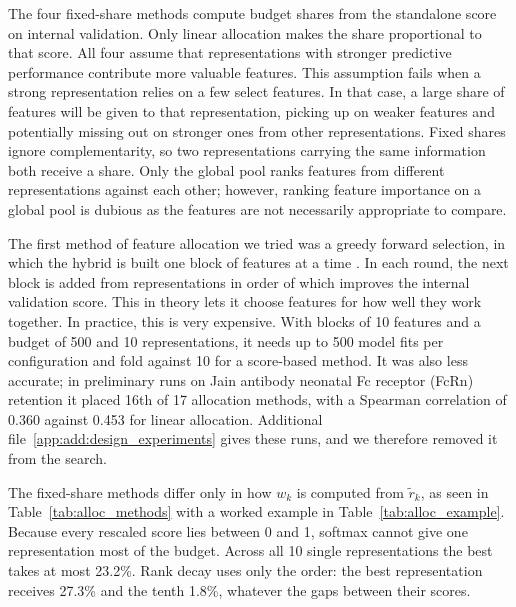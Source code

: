 The four fixed-share methods compute budget shares from the standalone score on internal validation. Only linear allocation makes the share proportional to that score. All four assume that representations with stronger predictive performance contribute more valuable features. This assumption fails when a strong representation relies on a few select features. In that case, a large share of features will be given to that representation, picking up on weaker features and potentially missing out on stronger ones from other representations. Fixed shares ignore complementarity, so two representations carrying the same information both receive a share. Only the global pool ranks features from different representations against each other; however, ranking feature importance on a global pool is dubious as the features are not necessarily appropriate to compare. 

The first method of feature allocation we tried was a greedy forward selection, in which the hybrid is built one block of features at a time  \citep{Kohavi1997, Guyon2003}. In each round, the next block is added from representations in order of which improves the internal validation score. This in theory lets it choose features for how well they work together. In practice, this is very expensive. With blocks of 10 features and a budget of 500 and 10 representations, it needs up to 500 model fits per configuration and fold against 10 for a score-based method. It was also less accurate; in preliminary runs on Jain antibody neonatal Fc receptor (FcRn) retention it placed 16th of 17 allocation methods, with a Spearman correlation of 0.360 against 0.453 for linear allocation. Additional file~\ref{app:add:design_experiments} gives these runs, and we therefore removed it from the search.

The fixed-share methods differ only in how $w_k$ is computed from $\tilde r_k$, as seen in Table~\ref{tab:alloc_methods} with a worked example in Table~\ref{tab:alloc_example}. Because every rescaled score lies between 0 and 1, softmax cannot give one representation most of the budget. Across all 10 single representations the best takes at most 23.2\%. Rank decay uses only the order: the best representation receives 27.3\% and the tenth 1.8\%, whatever the gaps between their scores.

